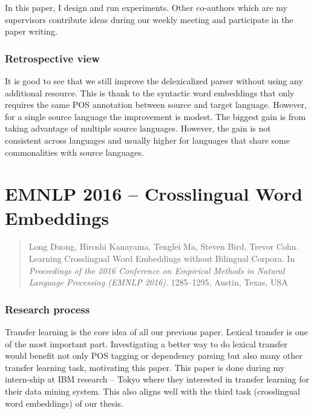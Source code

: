 \documentclass[12pt,twoside,final,hidelinks]{ltthesis}
\theoremstyle{definition}
\begin{document}
In this paper, I design and run experiments. Other co-authors which are my supervisors contribute ideas during our weekly 
meeting and participate in the paper writing. 

\subsubsection{Retrospective view}
It is good to see that we still improve the delexicalized parser without using any additional resource. This is thank to the syntactic word embeddings 
that only requires the same POS annotation between source and target language. However, for a single source language the improvement is modest. The biggest 
gain is from taking advantage of multiple source languages. However, the gain is not consistent across languages and usually higher for languages that share 
some commonalities with source languages. 






\section{EMNLP 2016 -- Crosslingual Word Embeddings}
\label{sec:emnlp16}
\begin{quote}
Long Duong, Hiroshi Kanayama, Tengfei Ma, Steven Bird, Trevor Cohn. Learning Crosslingual Word Embeddings without Bilingual Corpora. In \textit{Proceedings of the 2016 Conference on Empirical Methods in Natural Language Processing (EMNLP 2016)}. 1285--1295, Austin, Texas, USA\
\end{quote}

\subsubsection{Research process}
Transfer learning is the core idea of all our previous paper. Lexical transfer is one of the most important part. Investigating a better way to 
do lexical transfer would benefit not only POS tagging or dependency parsing but also many other transfer learning task, motivating this paper. 
This paper is done during my intern-ship at IBM research -- Tokyo where they interested in transfer learning for their data mining system. This also aligns 
well with the third task (crosslingual word embeddings) of our thesis. 
\end{document}
